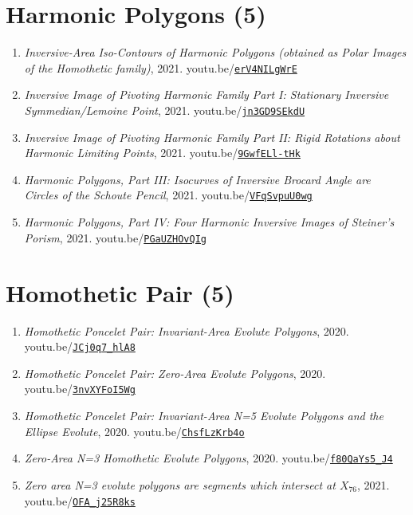 \documentclass[12pt]{article}
\begin{document}
\section{Harmonic Polygons (5)}

\begin{enumerate}[resume]
\item \textit{Inversive-Area Iso-Contours of Harmonic Polygons (obtained as Polar Images of the Homothetic family)}, 2021. youtu.be/\href{https://youtu.be/erV4NILgWrE}{\nolinkurl{erV4NILgWrE}}
\item \textit{Inversive Image of Pivoting Harmonic Family Part I: Stationary Inversive Symmedian/Lemoine Point}, 2021. youtu.be/\href{https://youtu.be/jn3GD9SEkdU}{\nolinkurl{jn3GD9SEkdU}}
\item \textit{Inversive Image of Pivoting Harmonic Family Part II: Rigid Rotations about Harmonic Limiting Points}, 2021. youtu.be/\href{https://youtu.be/9GwfELl-tHk}{\nolinkurl{9GwfELl-tHk}}
\item \textit{Harmonic Polygons, Part III: Isocurves of Inversive Brocard Angle are Circles of the Schoute Pencil}, 2021. youtu.be/\href{https://youtu.be/VFqSvpuU0wg}{\nolinkurl{VFqSvpuU0wg}}
\item \textit{Harmonic Polygons, Part IV: Four Harmonic Inversive Images of Steiner's Porism}, 2021. youtu.be/\href{https://youtu.be/PGaUZHOvQIg}{\nolinkurl{PGaUZHOvQIg}}
\end{enumerate}

\section{Homothetic Pair (5)}

\begin{enumerate}[resume]
\item \textit{Homothetic Poncelet Pair: Invariant-Area Evolute Polygons}, 2020. youtu.be/\href{https://youtu.be/JCj0q7_hlA8}{\nolinkurl{JCj0q7\_hlA8}}
\item \textit{Homothetic Poncelet Pair: Zero-Area Evolute Polygons}, 2020. youtu.be/\href{https://youtu.be/3nvXYFoI5Wg}{\nolinkurl{3nvXYFoI5Wg}}
\item \textit{Homothetic Poncelet Pair: Invariant-Area N=5 Evolute Polygons and the Ellipse Evolute}, 2020. youtu.be/\href{https://youtu.be/ChsfLzKrb4o}{\nolinkurl{ChsfLzKrb4o}}
\item \textit{Zero-Area N=3 Homothetic Evolute Polygons}, 2020. youtu.be/\href{https://youtu.be/f80QaYs5_J4}{\nolinkurl{f80QaYs5\_J4}}
\item \textit{Zero area N=3 evolute polygons are segments which intersect at $X_{76}$}, 2021. youtu.be/\href{https://youtu.be/OFA_j25R8ks}{\nolinkurl{OFA\_j25R8ks}}
\end{enumerate}
\end{document}
